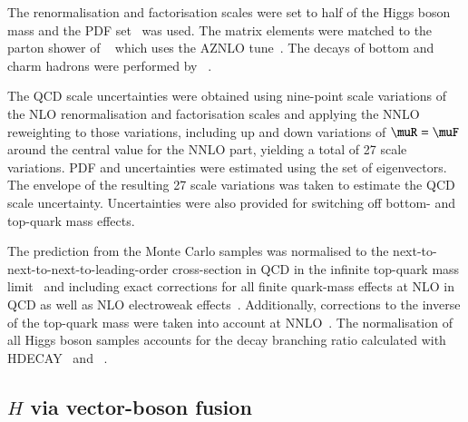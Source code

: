 The renormalisation and factorisation scales were set to half of the Higgs boson mass and the \PDFforLHC[15nnlo] PDF
set~\cite{Butterworth:2015oua} was used. The matrix elements were matched to the parton shower of \PYTHIA[8]~\cite{Sjostrand:2014zea}
which uses the AZNLO tune~\cite{STDM-2012-23}. The decays of bottom and charm hadrons
were performed by \EVTGEN~\cite{Lange:2001uf}.

The QCD scale uncertainties were obtained using nine-point scale variations of the NLO renormalisation and factorisation scales and applying the NNLO reweighting to those variations, including up and down variations of $\muR=\muF$ around the central value for the NNLO part, yielding a total of 27 scale variations.
PDF and \alphas uncertainties were estimated using the \PDFforLHC[15nlo] set of eigenvectors.
The envelope of the resulting 27 scale variations was taken to estimate the QCD scale uncertainty. 
Uncertainties were also provided for switching off bottom- and top-quark mass effects.

The prediction from the Monte Carlo samples was normalised to the next-to-next-to-next-to-leading-order 
cross-section in QCD in the infinite top-quark mass 
limit~\cite{deFlorian:2016spz,Anastasiou:2016cez,Anastasiou:2015ema,Dulat:2018rbf,Aglietti:2004nj} and including exact 
corrections for all finite quark-mass effects at NLO in QCD as well as NLO electroweak 
effects~\cite{Actis:2008ug,Bonetti:2018ukf}. Additionally, corrections to the inverse of the top-quark mass were taken 
into account at NNLO~\cite{Harlander:2009mq,Harlander:2009bw,Harlander:2009my,Pak:2009dg}. 
The normalisation of all Higgs boson samples accounts for the decay branching ratio calculated with 
HDECAY~\cite{Djouadi:1997yw,Spira:1997dg,Djouadi:2006bz}
and \PROPHECY~\cite{Bredenstein:2006ha,Bredenstein:2006rh,Bredenstein:2006nk}.


\subsection{$H$ via vector-boson fusion}


